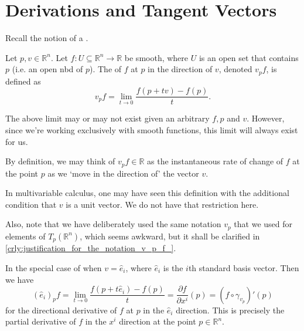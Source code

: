 \documentclass[notoc,notitlepage]{tufte-book}
\begin{document}
\section{Derivations and Tangent Vectors}%
\label{sec:derivations_and_tangent_vectors}

Recall the notion of a .

\begin{defn}\label{defn:directional_derivative}
  Let $p, v \in \mathbb{R}^n$. Let $f : U \subseteq \mathbb{R}^n \to \mathbb{R}$ be
  smooth, where $U$ is an open set that contains $p$ (i.e. an open nbd of $p$). The
   of $f$ at $p$ in the direction of $v$, denoted
  $v_p f$, is defined as
  \begin{equation}\label{eq:directional_derivative_defn}
    v_p f = \lim_{t \to 0} \frac{f(p + tv) - f(p)}{t}.
  \end{equation}
\end{defn}

\begin{remark}
  The above limit may or may not exist given an arbitrary $f, p$ and $v$. However,
  since we're working exclusively with smooth functions, this limit will always
  exist for us.
\end{remark}

\begin{note}
  By definition, we may think of $v_p f \in \mathbb{R}$ as the instantaneous rate of
  change of $f$ at the point $p$ as we `move in the direction of' the vector $v$.
\end{note}

\begin{remark}
  In multivariable calculus, one may have seen this definition with the additional
  condition that $v$ is a unit vector. We do not have that restriction here.

  Also, note that we have deliberately used the same notation $v_p$ that we used
  for elements of $T_p(\mathbb{R}^n)$, which seems awkward, but it shall be clarified
  in \cref{crly:justification_for_the_notation_v_p_f_}.
\end{remark}

\begin{eg}\label{eg:directional_derivative_on_basis_vectors}
  In the special case of when $v = \hat{e}_i$, where $\hat{e}_i$ is the $i$th
  standard basis vector. Then we have
  \begin{equation*}
    (\hat{e}_i)_p f = \lim_{t \to 0} \frac{f(p + t\hat{e}_i) - f(p)}{t}
      = \frac{\partial f}{\partial x^i}(p) = (f \circ \gamma_{v_p})'(p)
  \end{equation*}
  for the directional derivative of $f$ at $p$ in the $\hat{e}_i$ direction. This
  is precisely the partial derivative of $f$ in the $x^i$ direction at the point
  $p \in \mathbb{R}^n$.
\end{eg}
\end{document}
